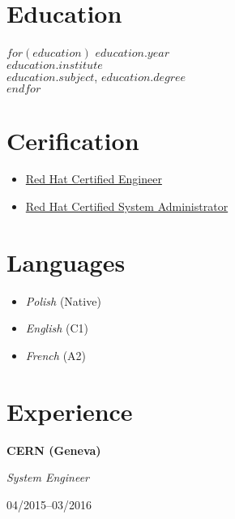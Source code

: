 \documentclass[$fontsize$, a4paper]{article}
\newcommand\textbox[1]{%
  \parbox{.333\textwidth}{#1}%
}
\begin{document}
\begin{multicols}{2}

\section*{Education}
$for(education)$
$education.year$\\
\emph{$education.institute$}\\
\textbf{$education.subject$}, $education.degree$\\

$endfor$

\columnbreak

\section*{Cerification}

\begin{itemize}
  \setlength\itemsep{-0.5em}
  \item \href{https://www.redhat.com/rhtapps/certification/verify/?certId=140-054-446}{Red Hat Certified Engineer}
  \item \href{https://www.redhat.com/rhtapps/certification/verify/?certId=140-054-446}{Red Hat Certified System Administrator}
\end{itemize}

\section*{Languages}
\begin{itemize}
  \setlength\itemsep{-0.5em}
  \item \emph{Polish} (Native)
  \item \emph{English} (C1)
  \item \emph{French} (A2)
\end{itemize}

\end{multicols}

\vspace{-10pt}



\section*{Experience}
\noindent

\noindent\textbox{\textbf{\textsc{CERN} (Geneva)}\hfill}\textbox{\hfil \emph{System Engineer}\hfil}\textbox{\hfill 04/2015--03/2016}
\end{document}
